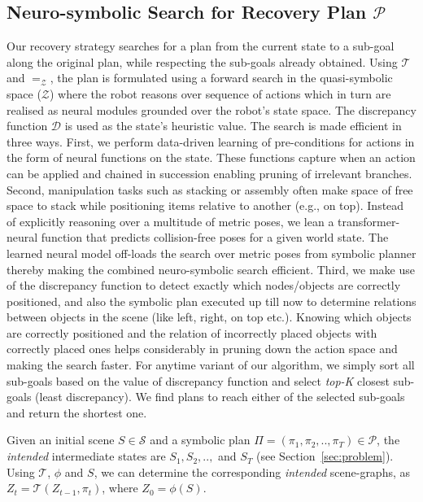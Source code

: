 \subsection{Neuro-symbolic Search for Recovery Plan $\mathcal{P}$}
\label{subsec:plan}
Our recovery strategy searches for a plan from the current state to a sub-goal along the original plan, while respecting the sub-goals already obtained. Using $\mathcal{T}$ and $=_\mathcal{Z}$, the plan is formulated using a forward search in the quasi-symbolic space ($\mathcal{Z}$) where the robot reasons over sequence of actions which in turn are realised as neural modules grounded over the robot’s state space. The discrepancy function $\mathcal{D}$ is used as the state's heuristic value. The search is made efficient in three ways. First,  we perform data-driven learning of pre-conditions for actions in the form of neural functions on the state. These functions capture when an action can be applied and chained in succession enabling pruning of irrelevant branches. Second, manipulation tasks such as stacking or assembly often make space of free space to stack while positioning items relative to another (e.g., on top). Instead of explicitly reasoning over a multitude of metric poses, we lean a transformer-neural function that predicts collision-free poses for a given world state. The learned neural model off-loads the search over metric poses from symbolic planner thereby making the combined neuro-symbolic search efficient. Third, we make use of the discrepancy function to detect exactly which nodes/objects are correctly positioned, and also the symbolic plan executed up till now to determine relations between objects in the scene (like left, right, on top etc.). Knowing which objects are correctly positioned and the relation of incorrectly placed objects with correctly placed ones helps considerably in pruning down the action space and making the search faster. For anytime variant of our algorithm, we simply sort all sub-goals based on the value of discrepancy function and select \textit{top-K} closest sub-goals (least discrepancy). We find plans to reach either of the selected sub-goals and return the shortest one.

Given an initial scene $S \in \mathcal{S}$ and a symbolic plan $\Pi = (\pi_1, \pi_2, .., \pi_T) \in \mathcal{P}$, the \textit{intended} intermediate states are $S_1, S_2, ..,$ and $S_T$ (see Section~\ref{sec:problem}). Using $\mathcal{T}$, $\phi$ and $S$, we can determine the corresponding \textit{intended} scene-graphs, as $Z_t = \mathcal{T}(Z_{t-1}, \pi_t)$, where $Z_0 = \phi(S)$. 

